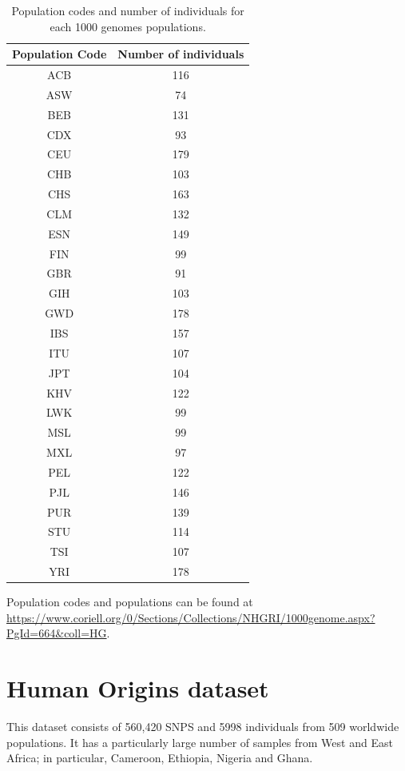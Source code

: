 \begin{table}
\centering\begingroup\fontsize{9}{11}\selectfont

\begin{tabular}[t]{cc}
\toprule
Population Code & Number of individuals\\
\midrule
ACB & 116\\
ASW & 74\\
BEB & 131\\
CDX & 93\\
CEU & 179\\
CHB & 103\\
CHS & 163\\
CLM & 132\\
ESN & 149\\
FIN & 99\\
GBR & 91\\
GIH & 103\\
GWD & 178\\
IBS & 157\\
ITU & 107\\
JPT & 104\\
KHV & 122\\
LWK & 99\\
MSL & 99\\
MXL & 97\\
PEL & 122\\
PJL & 146\\
PUR & 139\\
STU & 114\\
TSI & 107\\
YRI & 178\\
\bottomrule
\end{tabular}
\endgroup{}
\caption{Population codes and number of individuals for each 1000 genomes populations.}
\end{table}

Population codes and populations can be found at \url{https://www.coriell.org/0/Sections/Collections/NHGRI/1000genome.aspx?PgId=664&coll=HG}.





\section{Human Origins dataset} \label{HumanOriginsAppendix}

This dataset consists of 560,420 SNPS and 5998 individuals from 509 worldwide populations. It has a particularly large number of samples from West and East Africa; in particular, Cameroon, Ethiopia, Nigeria and Ghana. 

